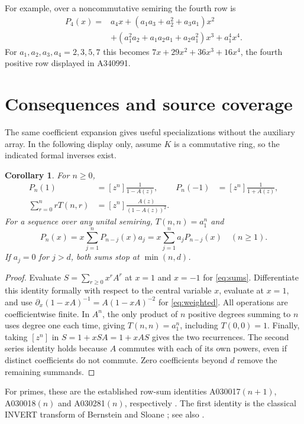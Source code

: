 \documentclass[11pt]{article}
\newtheorem{corollary}[theorem]{Corollary}
\begin{document}
For example, over a noncommutative semiring the fourth row is
\begin{align*}
 P_4(x)={}&a_4x+(a_1a_3+a_2^2+a_3a_1)x^2\\
 &+(a_1^2a_2+a_1a_2a_1+a_2a_1^2)x^3+a_1^4x^4 .
\end{align*}
For $a_1,a_2,a_3,a_4=2,3,5,7$ this becomes
$7x+29x^2+36x^3+16x^4$, the fourth positive row displayed in
A340991.

\section{Consequences and source coverage}
The same coefficient expansion gives useful specializations without the
auxiliary array. In the following display only, assume $K$ is a
commutative ring, so the indicated formal inverses exist.

\begin{corollary}\label{cor:sums}
For $n\geq0$,
\begin{align}
 P_n(1)&=[z^n]\frac{1}{1-A(z)},&
 P_n(-1)&=[z^n]\frac{1}{1+A(z)},\label{eq:sums}\\
 \sum_{r=0}^n rT(n,r)&=[z^n]\frac{A(z)}{(1-A(z))^2}.
 &&\label{eq:weighted}
\end{align}
For a sequence over any unital semiring, $T(n,n)=a_1^n$ and
\begin{equation}\label{eq:twosided}
 P_n(x)=x\sum_{j=1}^n P_{n-j}(x)a_j
       =x\sum_{j=1}^n a_jP_{n-j}(x)\quad(n\geq1).
\end{equation}
If $a_j=0$ for $j>d$, both sums stop at $\min(n,d)$.
\end{corollary}
\begin{proof}
Evaluate $S=\sum_{r\geq0}x^rA^r$ at $x=1$ and $x=-1$ for
\eqref{eq:sums}. Differentiate this identity formally with respect to
the central variable $x$, evaluate at $x=1$, and use
$\partial_x(1-xA)^{-1}=A(1-xA)^{-2}$ for \eqref{eq:weighted}.
All operations are coefficientwise finite. In $A^n$, the only product
of $n$ positive degrees summing to $n$ uses degree one each time,
giving $T(n,n)=a_1^n$, including $T(0,0)=1$. Finally, taking
$[z^n]$ in $S=1+xSA=1+xAS$ gives the two recurrences. The second
series identity holds because $A$ commutes with each of its own powers,
even if distinct coefficients do not commute. Zero coefficients beyond
$d$ remove the remaining summands.
\end{proof}

For primes, these are the established row-sum identities A030017$(n+1)$,
A030018$(n)$ and A030281$(n)$, respectively \cite{sequences}.
The first identity is the classical INVERT transform of Bernstein and
Sloane \cite[\S1, INVERT]{bernstein}; see also \cite{transforms}.
\end{document}
